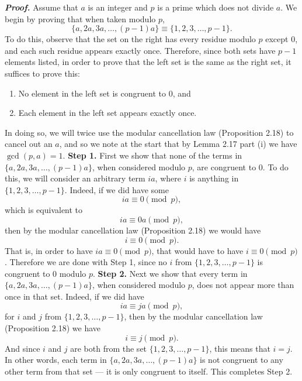 \documentclass{report}
\begin{document}
\begin{itemize}
        \textbf{\textit{Proof.}} 
        Assume that $a$ is an integer and $p$ is a prime which does not divide $a$. We begin by proving that when taken modulo $p$,
        \[
            \{a, 2a, 3a, \dots, (p-1)a\} \equiv \{1, 2, 3, \dots, p-1\}.
        \]
        To do this, observe that the set on the right has every residue modulo $p$ except $0$, and each such residue appears exactly once. Therefore, since both sets have $p-1$ elements listed, in order to prove that the left set is the same as the right set, it suffices to prove this:
        \begin{enumerate}
            \item No element in the left set is congruent to $0$, and
            \item Each element in the left set appears exactly once.
        \end{enumerate}
        In doing so, we will twice use the modular cancellation law (Proposition 2.18) to cancel out an $a$, and so we note at the start that by Lemma 2.17 part (i) we have $\gcd(p, a) = 1$.
        \bigbreak \noindent 
        \textbf{Step 1.} First we show that none of the terms in $\{a, 2a, 3a, \dots, (p-1)a\}$, when considered modulo $p$, are congruent to $0$. To do this, we will consider an arbitrary term $ia$, where $i$ is anything in $\{1, 2, 3, \dots, p-1\}$. Indeed, if we did have some
        \[
            ia \equiv 0 \pmod{p},
        \]
        which is equivalent to
        \[
            ia \equiv 0a \pmod{p},
        \]
        then by the modular cancellation law (Proposition 2.18) we would have
        \[
            i \equiv 0 \pmod{p}.
        \]
        That is, in order to have $ia \equiv 0 \pmod{p}$, that would have to have $i \equiv 0 \pmod{p}$. Therefore we are done with Step 1, since no $i$ from $\{1, 2, 3, \dots, p-1\}$ is congruent to $0$ modulo $p$.
        \bigbreak \noindent 
        \textbf{Step 2.} Next we show that every term in $\{a, 2a, 3a, \dots, (p-1)a\}$, when considered modulo $p$, does not appear more than once in that set. Indeed, if we did have
        \[
            ia \equiv ja \pmod{p},
        \]
        for $i$ and $j$ from $\{1, 2, 3, \dots, p-1\}$, then by the modular cancellation law (Proposition 2.18) we have
        \[
            i \equiv j \pmod{p}.
        \]
        And since $i$ and $j$ are both from the set $\{1, 2, 3, \dots, p-1\}$, this means that $i = j$. In other words, each term in $\{a, 2a, 3a, \dots, (p-1)a\}$ is not congruent to any other term from that set — it is only congruent to itself. This completes Step 2.

\end{itemize}
\end{document}
